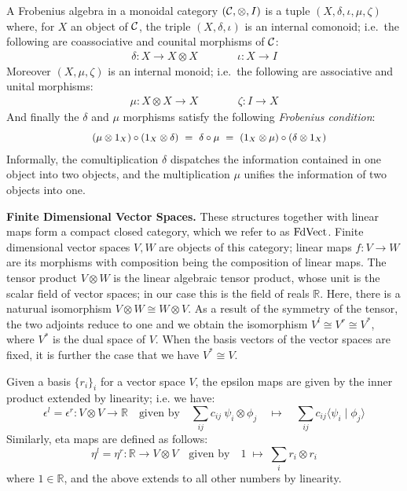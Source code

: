 A Frobenius algebra  in a   monoidal  category $({\cal
  C}, \otimes, I)$ is a tuple $(X,  \delta, \iota, \mu, \zeta)$ where,
for $X$ an object of ${\cal C}$, the triple $(X, \delta, \iota)$ is  an internal comonoid; 
i.e.~the following are  coassociative and counital  morphisms of ${\cal
  C}$:
\begin{align*}
\delta \colon X \to X \otimes X&\qquad& \iota \colon X \to I
\end{align*}
Moreover $(X, \mu, \zeta)$ is  an internal  monoid; i.e.~the following are  associative and unital  morphisms:
\begin{align*}
\mu \colon  X \otimes X \to X  &\qquad& \zeta \colon I \to X
\end{align*}
And finally the  $\delta$ and $\mu$ morphisms satisfy the
following \emph{Frobenius condition}:
\begin{align*}
\mbox{\small $(\mu \otimes 1_X) \circ (1_X \otimes \delta) \ = \  \delta \circ \mu  \ = \  (1_X \otimes \mu) \circ (\delta \otimes 1_X)$}
\end{align*}
Informally, the  comultiplication $\delta$  dispatches the information contained in
one object into two objects, and the  multiplication $\mu$ unifies  the
information of two objects into one.




\medskip
\noindent
{\bf Finite Dimensional Vector Spaces.}
These structures  together with  linear maps  form a compact
closed category, which we refer to as $\mathrm{FdVect}$.  Finite dimensional
vector spaces $V, W$ are objects of this category; linear maps $f
\colon V \to W$ are its morphisms with composition being the
composition of linear maps. The tensor product $V
\otimes W$ is the 
linear algebraic tensor product,
whose unit is the scalar
field of vector spaces; in our case this is the field of reals
$\mathbb{R}$.  Here, there is  a naturual
isomorphism $V \otimes W \cong W \otimes V$. As a result of the
symmetry of the tensor, the two adjoints reduce to one and we obtain the  isomorphism $V^l \cong V^r \cong V^*$, 
where $V^*$ is the dual space of $V$. When the
basis vectors of the vector spaces are fixed, it is further the case
that we have $V^* \cong V$.

%
Given a basis $\{r_i\}_i$ for a vector space $V$, the epsilon maps are
given by the inner product extended by linearity; i.e. we have:
\[
\epsilon^l  =  \epsilon^r \colon   V \otimes V \to \mathbb{R} \quad \mbox{given by} \quad
\sum_{ij} c_{ij} \ \psi_i \otimes \phi_j  \quad \mapsto \quad \sum_{ij} c_{ij} \langle \psi_i \mid \phi_j \rangle\]
Similarly, eta maps   are defined as follows:
\[
\eta^l = \eta^r \colon   \mathbb{R} \to V \otimes V
\quad \mbox{given by} \quad 
1 \; \mapsto \; \sum_i r_i \otimes r_i
\]
where $1 \in \mathbb{R}$, and the above  extends to all
other numbers by linearity.



